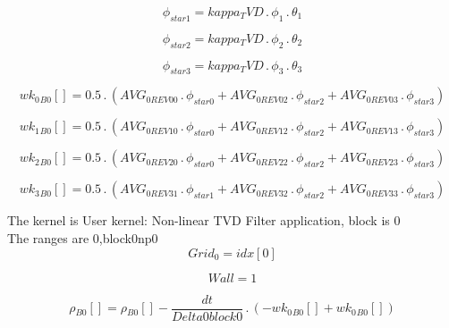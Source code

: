 \documentclass{article}
\begin{document}
\begin{dmath}\phi_{star 1} = kappa_TVD \,.\, \phi_{1} \,.\, \theta_{1}\end{dmath}

\begin{dmath}\phi_{star 2} = kappa_TVD \,.\, \phi_{2} \,.\, \theta_{2}\end{dmath}

\begin{dmath}\phi_{star 3} = kappa_TVD \,.\, \phi_{3} \,.\, \theta_{3}\end{dmath}

\begin{dmath}{wk_{0}{_{B0}}}[{}] = 0.5 \,.\, \left(AVG_{0 REV 00} \,.\, \phi_{star 0} + AVG_{0 REV 02} \,.\, \phi_{star 2} + AVG_{0 REV 03} \,.\, \phi_{star 3}\right)\end{dmath}

\begin{dmath}{wk_{1}{_{B0}}}[{}] = 0.5 \,.\, \left(AVG_{0 REV 10} \,.\, \phi_{star 0} + AVG_{0 REV 12} \,.\, \phi_{star 2} + AVG_{0 REV 13} \,.\, \phi_{star 3}\right)\end{dmath}

\begin{dmath}{wk_{2}{_{B0}}}[{}] = 0.5 \,.\, \left(AVG_{0 REV 20} \,.\, \phi_{star 0} + AVG_{0 REV 22} \,.\, \phi_{star 2} + AVG_{0 REV 23} \,.\, \phi_{star 3}\right)\end{dmath}

\begin{dmath}{wk_{3}{_{B0}}}[{}] = 0.5 \,.\, \left(AVG_{0 REV 31} \,.\, \phi_{star 1} + AVG_{0 REV 32} \,.\, \phi_{star 2} + AVG_{0 REV 33} \,.\, \phi_{star 3}\right)\end{dmath}

\noindent The kernel is User kernel: Non-linear TVD Filter application, block is 0\\\noindent The ranges are 0,block0np0\\\begin{dmath}Grid_{0} = {idx}[{0}]\end{dmath}

\begin{dmath}Wall = 1\end{dmath}

\begin{dmath}{\rho{_{B0}}}[{}] = {\rho{_{B0}}}[{}] - \frac{dt}{Delta0block0} \,.\, \left(- {wk_{0}{_{B0}}}[{}] + {wk_{0}{_{B0}}}[{}]\right)\end{dmath}
\end{document}
